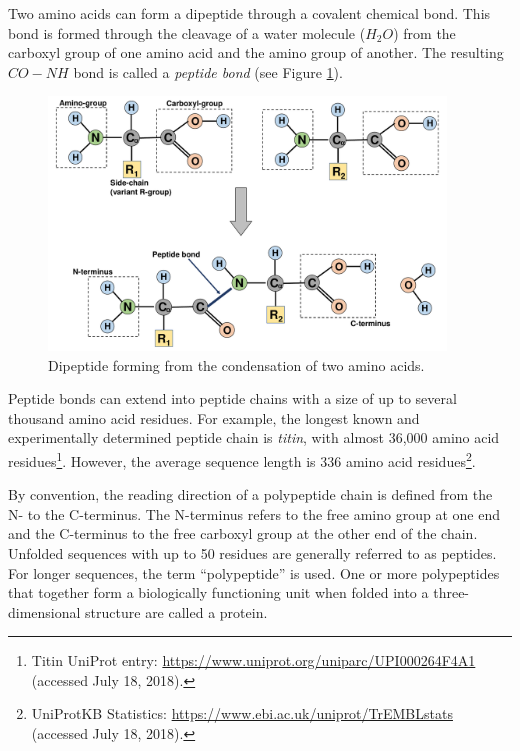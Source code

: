 Two amino acids can form a dipeptide through a covalent chemical bond. This bond is formed through the cleavage of a water molecule ($H_2O$) from the carboxyl group of one amino acid  and the amino group of another. The resulting $CO-NH$ bond is called a \textit{peptide bond} (see Figure \ref{fig:dipeptide}). 

\begin{figure}[b!]
	\begin{center}
		\includegraphics[width=0.94\textwidth]{fig/peptideBond}
	\end{center}
	\caption{Dipeptide forming from the condensation of two amino acids. }
	\label{fig:dipeptide}
\end{figure}

Peptide bonds can extend into peptide chains with a size of up to several thousand  amino acid residues. For example, the longest known and experimentally determined peptide chain is \textit{titin},  with almost 36,000 amino acid residues\footnote{Titin UniProt entry: \url{https://www.uniprot.org/uniparc/UPI000264F4A1} (accessed July 18, 2018).}. However, the average sequence length is 336 amino acid residues\footnote{UniProtKB Statistics: \url{https://www.ebi.ac.uk/uniprot/TrEMBLstats} (accessed July 18, 2018).}.

 By convention, the reading direction of a polypeptide chain is defined from the N- to the C-terminus. The N-terminus refers to the free amino group at one end and the \mbox{C-terminus} to the free carboxyl group at the other end of the chain. 
 Unfolded sequences with up to 50 residues are generally referred to as peptides. For longer sequences, the term ``polypeptide'' is used. 
 One or more polypeptides that together form a biologically functioning unit when folded into a three-dimensional structure are called a protein. 

